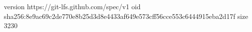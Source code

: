 version https://git-lfs.github.com/spec/v1
oid sha256:8e9ac69c2de770e8b25d3d8e4433af649e573cff56cce553c6444915eba2d17f
size 3230
